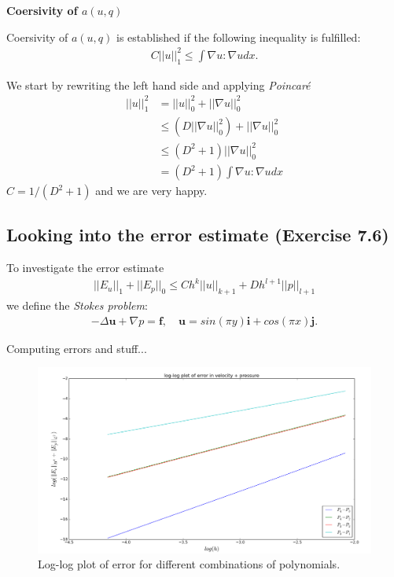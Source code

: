 \documentclass[11pt,a4paper,english]{article}
\numberwithin{equation}{section}
\begin{document}
 
\newpage

\textbf{Coersivity of $a(u,q)$}

Coersivity of $a(u,q)$ is established if the following inequality is fulfilled:
\begin{align*}
C||u||_1^2 \leq \int \nabla u : \nabla u dx. 
\end{align*}

We start by rewriting the left hand side and applying \emph{Poincaré}
\begin{align*}
||u||_1^2 &= ||u||_0^2 + ||\nabla u||_0^2 \\
 &\leq (D||\nabla u||_0^2)+||\nabla u||_0^2 \\
 &\leq (D^2+1)||\nabla u||^2_0 \\
 &=  (D^2+1)\int \nabla u : \nabla u dx
\end{align*}
$C = 1/(D^2+1)$ and we are very happy. 

\newpage

\subsection{Looking into the error estimate (Exercise 7.6)}

To investigate the error estimate
\begin{align*}
||E_u||_1 + ||E_p||_0 \leq Ch^k ||u||_{k+1} + Dh^{l+1}||p||_{l+1}
\end{align*}
we define the \emph{Stokes problem}:
\begin{align*}
-\Delta \mathbf{u} + \nabla p = \mathbf{f}, \quad \mathbf{u} = sin(\pi y) \mathbf{i} + cos(\pi x) \mathbf{j}.
\end{align*}

Computing errors and stuff...

\begin{figure}[h!] 
\begin{center}
  \includegraphics[scale=0.25]{stokes_loglog.png}
  \end{center}
  \caption{Log-log plot of error for different combinations of polynomials.}
   \label{fig:stokes}
\end{figure}
\end{document}
